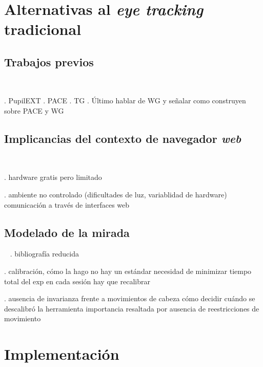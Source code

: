 \documentclass[aspectratio=169]{beamer}
\begin{document}
\section{Alternativas al \textit{eye tracking} tradicional}

\subsection{Trabajos previos}

\begin{frame}{~}

. PupilEXT
. PACE
. TG
. Último hablar de WG y señalar como construyen sobre PACE y WG

\end{frame}

\subsection{Implicancias del contexto de navegador \textit{web}}

\begin{frame}{~}

. hardware gratis pero limitado

. ambiente no controlado (dificultades de luz, variablidad de hardware)
  comunicación a través de interfaces web

\end{frame}

\subsection{Modelado de la mirada}

\begin{frame}{~}
. bibliografía reducida

. calibración, cómo la hago
  no hay un estándar
  necesidad de minimizar tiempo total del exp
  en cada sesión hay que recalibrar

. ausencia de invarianza frente a movimientos de cabeza
  cómo decidir cuándo se descalibró la herramienta
  importancia resaltada por ausencia de reestricciones de movimiento
\end{frame}

\section{Implementación}
\end{document}

